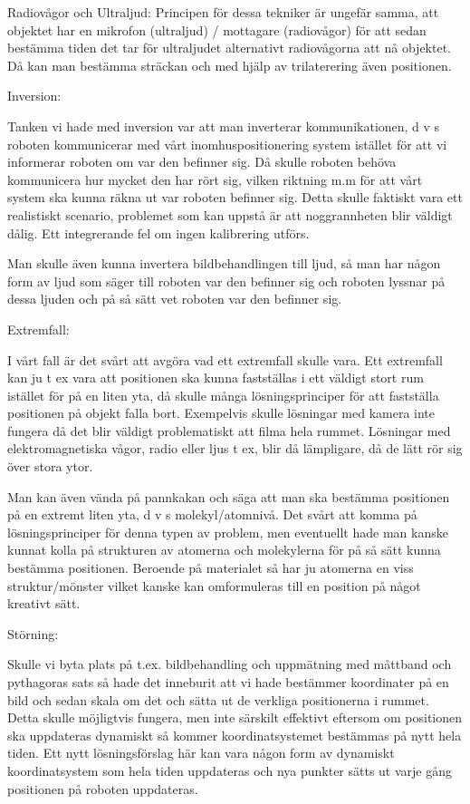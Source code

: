 \documentclass[11pt, a4paper]{report}
\begin{document}
Radiovågor och Ultraljud:
Principen för dessa tekniker är ungefär samma, att objektet har en mikrofon (ultraljud) / mottagare (radiovågor) för att sedan bestämma tiden det tar för ultraljudet alternativt radiovågorna att nå objektet. Då kan man bestämma sträckan och med hjälp av trilaterering även positionen.


Inversion:

Tanken vi hade med inversion var att man inverterar kommunikationen, d v s roboten kommunicerar med vårt inomhuspositionering system istället för att vi informerar roboten om var den befinner sig. Då skulle roboten behöva kommunicera hur mycket den har rört sig, vilken riktning m.m för att vårt system ska kunna räkna ut var roboten befinner sig. Detta skulle faktiskt vara ett realistiskt scenario, problemet som kan uppstå är att noggrannheten blir väldigt dålig. Ett integrerande fel om ingen kalibrering utförs.

Man skulle även kunna invertera bildbehandlingen till ljud, så man har någon form av ljud som säger till roboten var den befinner sig och roboten lyssnar på dessa ljuden och på så sätt vet roboten var den befinner sig. 

Extremfall:

I vårt fall är det svårt att avgöra vad ett extremfall skulle vara. Ett extremfall kan ju t ex vara att positionen ska kunna fastställas i ett väldigt stort rum istället för på en liten yta, då skulle många lösningsprinciper för att fastställa positionen på objekt falla bort. Exempelvis skulle lösningar med kamera inte fungera då det blir väldigt problematiskt att filma hela rummet. Lösningar med elektromagnetiska vågor, radio eller ljus t ex, blir då lämpligare, då de lätt rör sig över stora ytor.

Man kan även vända på pannkakan och säga att man ska bestämma positionen på en extremt liten yta, d v s molekyl/atomnivå. Det svårt att komma på lösningsprinciper för denna typen av problem, men eventuellt hade man kanske kunnat kolla på strukturen av atomerna och molekylerna för på så sätt kunna bestämma positionen. Beroende på materialet så har ju atomerna en viss struktur/mönster vilket kanske kan omformuleras till en position på något kreativt sätt.


Störning:

Skulle vi byta plats på t.ex. bildbehandling och uppmätning med måttband och pythagoras sats så hade det inneburit att vi hade bestämmer koordinater på en bild och sedan skala om det och sätta ut de verkliga positionerna i rummet. Detta skulle möjligtvis fungera, men inte särskilt effektivt eftersom om positionen ska uppdateras dynamiskt så kommer koordinatsystemet bestämmas på nytt hela tiden. Ett nytt lösningsförslag här kan vara någon form av dynamiskt koordinatsystem som hela tiden uppdateras och nya punkter sätts ut varje gång positionen på roboten uppdateras.
\end{document}
